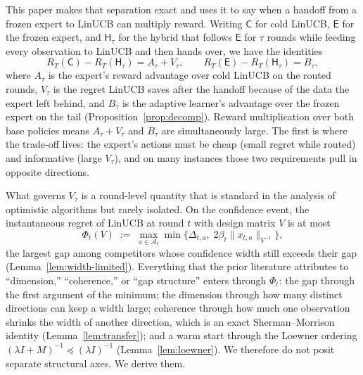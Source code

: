 \documentclass{article}
\theoremstyle{definition}
\theoremstyle{remark}
\theoremstyle{remark}
\newcommand{\Cold}{\mathsf{C}}
\newcommand{\Exp}{\mathsf{E}}
\newcommand{\Hyb}{\mathsf{H}}
\begin{document}
This paper makes that separation exact and uses it to say when a handoff from
a frozen expert to LinUCB can multiply reward. Writing $\Cold$ for cold LinUCB,
$\Exp$ for the frozen expert, and $\Hyb_\tau$ for the hybrid that follows
$\Exp$ for $\tau$ rounds while feeding every observation to LinUCB and then
hands over, we have the identities
\[
R_T(\Cold)-R_T(\Hyb_\tau)=A_\tau+V_\tau,
\qquad
R_T(\Exp)-R_T(\Hyb_\tau)=B_\tau,
\]
where $A_\tau$ is the expert's reward advantage over cold LinUCB on the routed
rounds, $V_\tau$ is the regret LinUCB saves after the handoff because of the
data the expert left behind, and $B_\tau$ is the adaptive learner's advantage
over the frozen expert on the tail (Proposition~\ref{prop:decomp}). Reward
multiplication over both base policies means $A_\tau+V_\tau$ and $B_\tau$ are
simultaneously large. The first is where the trade-off lives: the expert's
actions must be cheap (small regret while routed) and informative (large
$V_\tau$), and on many instances those two requirements pull in opposite
directions.

What governs $V_\tau$ is a round-level quantity that is standard in the
analysis of optimistic algorithms but rarely isolated. On the confidence event,
the instantaneous regret of LinUCB at round $t$ with design matrix $V$ is at
most
\[
\Phi_t(V)\;:=\;\max_{a\in\mathcal A_t}\min\bigl\{\Delta_{t,a},\;2\beta_t\|x_{t,a}\|_{V^{-1}}\bigr\},
\]
the largest gap among competitors whose confidence width still exceeds their
gap (Lemma~\ref{lem:width-limited}). Everything that the prior literature
attributes to ``dimension,'' ``coherence,'' or ``gap structure'' enters through
$\Phi_t$: the gap through the first argument of the minimum; the dimension
through how many distinct directions can keep a width large; coherence
through how much one observation shrinks the width of another direction, which
is an exact Sherman--Morrison identity (Lemma~\ref{lem:transfer}); and a warm
start through the Loewner ordering $(\lambda I+M)^{-1}\preceq(\lambda I)^{-1}$
(Lemma~\ref{lem:loewner}). We therefore do not posit separate structural axes.
We derive them.
\end{document}
